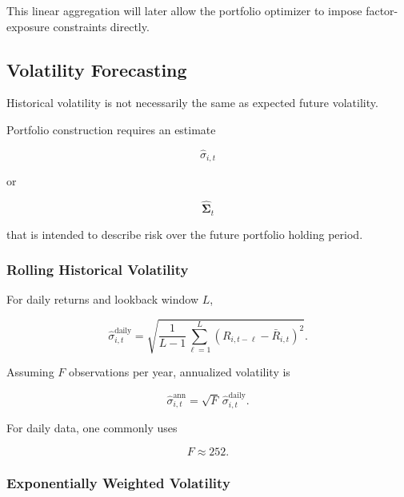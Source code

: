 \documentclass[11pt,a4paper]{article}
\begin{document}
This linear aggregation will later allow the portfolio optimizer to impose
factor-exposure constraints directly.


\subsection{Volatility Forecasting}
\label{subsec:volatility_forecasting}

Historical volatility is not necessarily the same as expected future
volatility.

Portfolio construction requires an estimate

\begin{equation}
\widehat{\sigma}_{i,t}
\end{equation}

or

\begin{equation}
\widehat{\boldsymbol{\Sigma}}_t
\end{equation}

that is intended to describe risk over the future portfolio holding period.


\subsubsection{Rolling Historical Volatility}

For daily returns and lookback window $L$,

\begin{equation}
\widehat{\sigma}_{i,t}^{\mathrm{daily}}
=
\sqrt{
\frac{1}{L-1}
\sum_{\ell=1}^{L}
\left(
R_{i,t-\ell}
-
\bar{R}_{i,t}
\right)^2
}.
\end{equation}

Assuming $F$ observations per year, annualized volatility is

\begin{equation}
\boxed{
\widehat{\sigma}_{i,t}^{\mathrm{ann}}
=
\sqrt{F}
\,
\widehat{\sigma}_{i,t}^{\mathrm{daily}}.
}
\end{equation}

For daily data, one commonly uses

\begin{equation}
F\approx252.
\end{equation}


\subsubsection{Exponentially Weighted Volatility}
\end{document}
